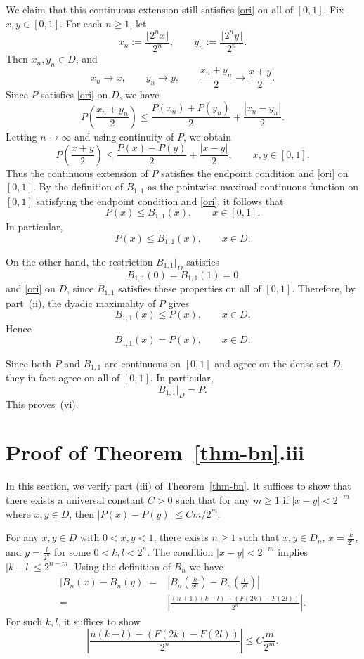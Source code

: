 \documentclass[11pt]{amsart}
\theoremstyle{definition}
\renewcommand{\1}{{\mathbbm{1}}}
\begin{document}
We claim that this continuous extension still satisfies \eqref{ori} on all of $[0,1]$.
Fix $x,y\in[0,1]$. For each $n\ge1$, let
\[
x_n:=\frac{\lfloor 2^n x\rfloor}{2^n},
\qquad
y_n:=\frac{\lfloor 2^n y\rfloor}{2^n}.
\]
Then $x_n,y_n\in D$, and
\[
x_n\to x,\qquad y_n\to y,\qquad \frac{x_n+y_n}{2}\to \frac{x+y}{2}.
\]
Since $P$ satisfies \eqref{ori} on $D$, we have
\[
P\!\left(\frac{x_n+y_n}{2}\right)
\le
\frac{P(x_n)+P(y_n)}{2}
+\frac{|x_n-y_n|}{2}.
\]
Letting $n\to\infty$ and using continuity of $P$, we obtain
\[
P\!\left(\frac{x+y}{2}\right)
\le
\frac{P(x)+P(y)}{2}
+\frac{|x-y|}{2},
\qquad x,y\in[0,1].
\]
Thus the continuous extension of $P$ satisfies the endpoint condition and
\eqref{ori} on $[0,1]$.
By the definition of $B_{1,1}$ as the pointwise maximal continuous function on
$[0,1]$ satisfying the endpoint condition and \eqref{ori}, it follows that
\[
P(x)\le B_{1,1}(x),\qquad x\in[0,1].
\]
In particular,
\[
P(x)\le B_{1,1}(x),\qquad x\in D.
\]

On the other hand, the restriction $B_{1,1}|_D$ satisfies
\[
B_{1,1}(0)=B_{1,1}(1)=0
\]
and \eqref{ori} on $D$, since $B_{1,1}$ satisfies these properties on all of
$[0,1]$. Therefore, by part~(ii), the dyadic maximality of $P$ gives
\[
B_{1,1}(x)\le P(x),\qquad x\in D.
\]
Hence
\[
B_{1,1}(x)=P(x),\qquad x\in D.
\]

Since both $P$ and $B_{1,1}$ are continuous on $[0,1]$ and agree on the dense set
$D$, they in fact agree on all of $[0,1]$. In particular,
\[
B_{1,1}|_D=P.
\]
This proves~(vi).


\section{Proof of  Theorem~\ref{thm-bn}.iii }
In this section, we verify part (iii) of Theorem~\ref{thm-bn}. It suffices to show that there exists a universal constant $C>0$ such that for any $m\geq 1$ if $|x-y|< 2^{-m}$ where $x,y \in D$, then $|P(x)-P(y)|\leq Cm/2^{m}$. 




For any $x,y\in D$ with $0<x,y<1$, there exists $n\ge 1$ such that
$x,y\in D_n$, $x=\frac{k}{2^n}$, and $y=\frac{l}{2^n}$ for some
$0<k,l<2^n$.
The condition $|x-y|<2^{-m} $ implies
$|k-l|\leq 2^{n-m}$.
Using the definition of $B_n$ we have 
\begin{align*}
|B_n(x) - B_n(y)| =& \left| B_n\left(\frac{k}{2^n}\right) -B_n\left(\frac{l}{2^n}\right)
    \right|\\
    =&
    \left|
\frac{ (n+1) (k-l) - (F(2k) - F(2l))  }{2^n}
    \right|.
\end{align*}
For such $k,l$, it suffices to show
\begin{equation}
     \left|\frac{ n (k-l) - (F(2k) - F(2l))  }{2^n}
    \right|\leq C\frac{m}{2^{m}}\label{eq:whatweneed}.
\end{equation}
\end{document}
